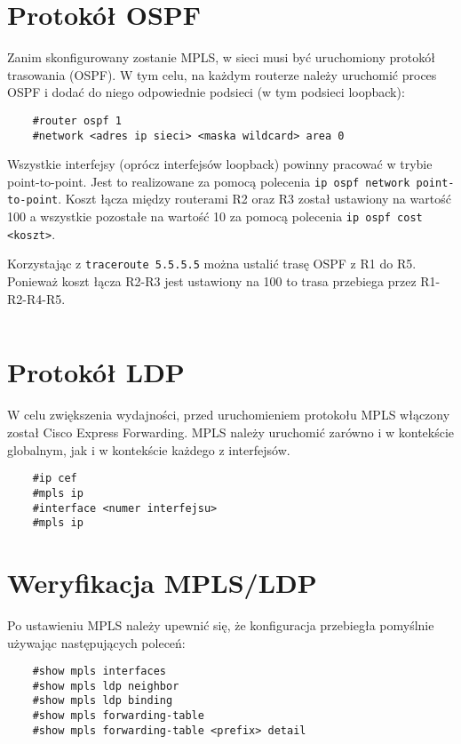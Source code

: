 \documentclass[a4paper,12pt,notitlepage]{article}
\begin{document}
\section{Protokół OSPF}

Zanim skonfigurowany zostanie MPLS, w sieci musi być uruchomiony protokół trasowania (OSPF). W tym celu, na każdym routerze należy uruchomić proces OSPF i dodać do niego odpowiednie podsieci (w tym podsieci loopback):
\begin{verbatim}
    #router ospf 1
    #network <adres ip sieci> <maska wildcard> area 0
\end{verbatim}

Wszystkie interfejsy (oprócz interfejsów loopback) powinny pracować w trybie point-to-point. Jest to realizowane za pomocą polecenia \texttt{ip ospf network point-to-point}. Koszt łącza między routerami R2 oraz R3 został ustawiony na wartość 100 a wszystkie pozostałe na wartość 10 za pomocą polecenia \texttt{ip ospf cost <koszt>}.

Korzystając z  \texttt{traceroute 5.5.5.5} można ustalić trasę OSPF z R1 do R5. Ponieważ koszt łącza R2-R3 jest ustawiony na 100 to trasa przebiega przez R1-R2-R4-R5.
\inputminted[label=Traceroute R1 do R5, firstline=175, lastline=182]{text}{R/R1.txt}

\section{Protokół LDP}

W celu zwiększenia wydajności, przed uruchomieniem protokołu MPLS włączony został Cisco Express Forwarding. MPLS należy uruchomić zarówno i w kontekście globalnym, jak i w kontekście każdego z interfejsów.
\begin{verbatim}
    #ip cef
    #mpls ip
    #interface <numer interfejsu>
    #mpls ip
\end{verbatim}

\section{Weryfikacja MPLS/LDP}

Po ustawieniu MPLS należy upewnić się, że konfiguracja przebiegła pomyślnie używając następujących poleceń:
\begin{verbatim}
    #show mpls interfaces
    #show mpls ldp neighbor
    #show mpls ldp binding
    #show mpls forwarding-table
    #show mpls forwarding-table <prefix> detail
\end{verbatim}
\end{document}
